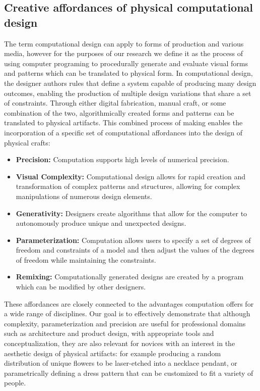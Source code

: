 \documentclass{sigchi}
\begin{document}
\subsection{Creative affordances of physical computational design}
The term computational design can apply to forms of production and various media, however for the purposes of our research we define it as the process of using computer programing to procedurally generate and evaluate visual forms and patterns which can be translated to physical form. In computational design, the designer authors rules that define a system capable of producing many design outcomes, enabling the production of multiple design variations that share a set of constraints. Through either digital fabrication, manual craft, or some combination of the two, algorithmically created forms and patterns can be translated to physical artifacts. This combined process of making enables the incorporation of a specific set of computational affordances into the design of physical crafts:
\begin{itemize}
\item \textbf{Precision:} Computation supports high levels of numerical precision.
\vspace{-8pt}
\item \textbf{Visual Complexity:} Computational design allows for rapid creation and transformation of complex patterns and structures, allowing for complex manipulations of numerous design elements.
\vspace{-6pt}
\item \textbf{Generativity:} Designers create algorithms that allow for the computer to autonomously produce unique and unexpected designs.
\vspace{-6pt}
\item \textbf{Parameterization:} Computation allows users to specify a set of degrees of freedom and constraints of a model and then adjust the values of the degrees of freedom while maintaining the constraints.
\vspace{-6pt}
\item \textbf{Remixing:} Computationally generated designs are created by a program which can be modified by other designers. 
\end{itemize} 
These affordances are closely connected to the advantages computation offers for a wide range of disciplines. Our goal is to effectively demonstrate that although complexity, parameterization and precision are useful for professional domains such as architecture and product design, with appropriate tools and conceptualization, they are also relevant for novices with an interest in the aesthetic design of physical artifacts: for example producing a random distribution of unique flowers to be laser-etched into a necklace pendant, or parametrically defining a dress pattern that can be customized to fit a variety of people. 
\end{document}
